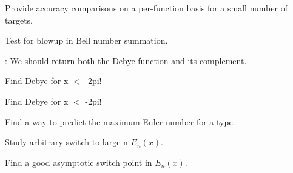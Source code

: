 
\begin{DoxyRefList}
\item[\label{todo__todo000001}%
\Hypertarget{todo__todo000001}%
page \hyperlink{index}{Mathematical Special Functions} ]Provide accuracy comparisons on a per-\/function basis for a small number of targets. 
\item[\label{todo__todo000016}%
\Hypertarget{todo__todo000016}%
Member \hyperlink{namespacestd_1_1____detail_acab68a50669a465d6bddc7a54a649819}{std\+:\+:\+\_\+\+\_\+detail\+:\+:\+\_\+\+\_\+bell\+\_\+series} (unsigned int \+\_\+\+\_\+n)]Test for blowup in Bell number summation.  
\item[\label{todo__todo000018}%
\Hypertarget{todo__todo000018}%
Member \hyperlink{namespacestd_1_1____detail_a26d3f285cfbcaba6fa30d3e4164c6187}{std\+:\+:\+\_\+\+\_\+detail\+:\+:\+\_\+\+\_\+debye} (unsigned int \+\_\+\+\_\+n, \+\_\+\+Tp \+\_\+\+\_\+x)]\+: We should return both the Debye function and it\textquotesingle{}s complement. 

Find Debye for x $<$ -\/2pi! 

Find Debye for x $<$ -\/2pi!  
\item[\label{todo__todo000004}%
\Hypertarget{todo__todo000004}%
Member \hyperlink{namespacestd_1_1____detail_a2e3eb67dee4d0b5c96824a4e8e9c227e}{std\+:\+:\+\_\+\+\_\+detail\+:\+:\+\_\+\+\_\+euler\+\_\+series} (unsigned int \+\_\+\+\_\+n)]Find a way to predict the maximum Euler number for a type.  
\item[\label{todo__todo000007}%
\Hypertarget{todo__todo000007}%
Member \hyperlink{namespacestd_1_1____detail_a0282700710ec07b8ca095fe2ec140d6e}{std\+:\+:\+\_\+\+\_\+detail\+:\+:\+\_\+\+\_\+expint} (unsigned int \+\_\+\+\_\+n, \+\_\+\+Tp \+\_\+\+\_\+x)]Study arbitrary switch to large-\/n $ E_n(x) $. 

Find a good asymptotic switch point in $ E_n(x) $. 


\end{DoxyRefList}
